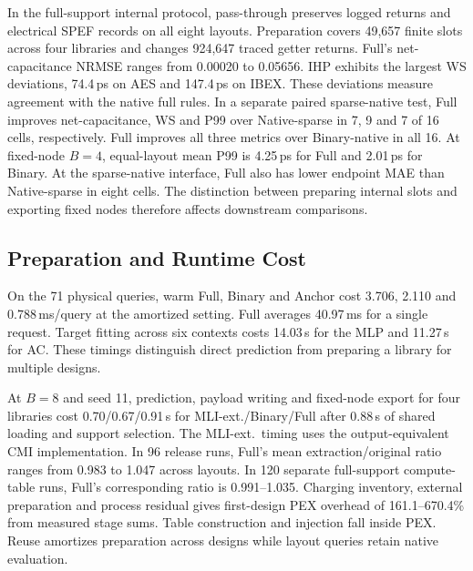 In the full-support internal protocol, pass-through preserves logged returns and electrical SPEF records on all eight layouts. Preparation covers 49,657 finite slots across four libraries and changes 924,647 traced getter returns. Full's net-capacitance NRMSE ranges from 0.00020 to 0.05656. IHP exhibits the largest WS deviations, 74.4\,ps on AES and 147.4\,ps on IBEX. These deviations measure agreement with the native full rules. In a separate paired sparse-native test, Full improves net-capacitance, WS and P99 over Native-sparse in 7, 9 and 7 of 16 cells, respectively. Full improves all three metrics over Binary-native in all 16. At fixed-node $B=4$, equal-layout mean P99 is 4.25\,ps for Full and 2.01\,ps for Binary. At the sparse-native interface, Full also has lower endpoint MAE than Native-sparse in eight cells. The distinction between preparing internal slots and exporting fixed nodes therefore affects downstream comparisons.

\subsection{Preparation and Runtime Cost}
On the 71 physical queries, warm Full, Binary and Anchor cost 3.706, 2.110 and 0.788\,ms/query at the amortized setting. Full averages 40.97\,ms for a single request. Target fitting across six contexts costs 14.03\,s for the MLP and 11.27\,s for AC. These timings distinguish direct prediction from preparing a library for multiple designs.

At $B=8$ and seed 11, prediction, payload writing and fixed-node export for four libraries cost 0.70/0.67/0.91\,s for MLI-ext./Binary/Full after 0.88\,s of shared loading and support selection. The MLI-ext.\ timing uses the output-equivalent CMI implementation. In 96 release runs, Full's mean extraction/original ratio ranges from 0.983 to 1.047 across layouts. In 120 separate full-support compute-table runs, Full's corresponding ratio is 0.991--1.035. Charging inventory, external preparation and process residual gives first-design PEX overhead of 161.1--670.4\% from measured stage sums. Table construction and injection fall inside PEX. Reuse amortizes preparation across designs while layout queries retain native evaluation.
\ifdefined\CapFillExtended\fi
